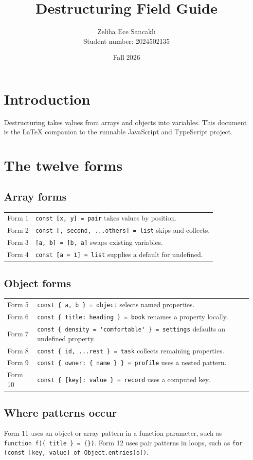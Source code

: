 \documentclass[11pt,a4paper]{article}
\title{Destructuring Field Guide}
\author{Zeliha Ece Sancaklı\\Student number: 2024502135}
\date{Fall 2026}
\begin{document}
\maketitle
\tableofcontents
\section{Introduction}
Destructuring takes values from arrays and objects into variables. This document is the LaTeX companion to the runnable JavaScript and TypeScript project.
\section{The twelve forms}
\subsection{Array forms}
\begin{longtable}{p{}p{}}
Form 1 & \lstinline|const [x, y] = pair| takes values by position.\\
Form 2 & \lstinline|const [, second, ...others] = list| skips and collects.\\
Form 3 & \lstinline|[a, b] = [b, a]| swaps existing variables.\\
Form 4 & \lstinline|const [a = 1] = list| supplies a default for undefined.\\
\end{longtable}
\subsection{Object forms}
\begin{longtable}{p{}p{}}
Form 5 & \lstinline|const { a, b } = object| selects named properties.\\
Form 6 & \lstinline|const { title: heading } = book| renames a property locally.\\
Form 7 & \lstinline|const { density = 'comfortable' } = settings| defaults an undefined property.\\
Form 8 & \lstinline|const { id, ...rest } = task| collects remaining properties.\\
Form 9 & \lstinline|const { owner: { name } } = profile| uses a nested pattern.\\
Form 10 & \lstinline|const { [key]: value } = record| uses a computed key.\\
\end{longtable}
\subsection{Where patterns occur}
Form 11 uses an object or array pattern in a function parameter, such as \lstinline|function f({ title } = {})|. Form 12 uses pair patterns in loops, such as \lstinline|for (const [key, value] of Object.entries(o))|.
\end{document}
